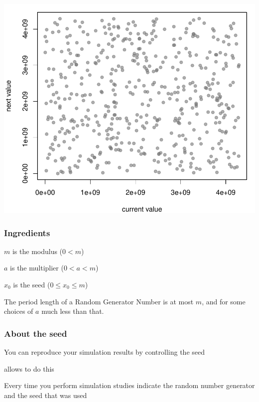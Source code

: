 \documentclass[12pt]{beamer}\usepackage[]{graphicx}\usepackage[]{color}
\newenvironment{knitrout}{}{} %
\begin{document}
\begin{frame}[fragile]

\begin{knitrout}\footnotesize
{}\color{fgcolor}

{\centering \includegraphics[width=.8\linewidth,height=.65\linewidth]{figure/unnamed-chunk-4-1} 

}



\end{knitrout}

\end{frame}


\begin{frame}
\frametitle{Ingredients}

\bi
  \item $m$ is the modulus ($0 < m$)
  \item $a$ is the multiplier ($0 < a < m$)
  \item $x_0$ is the seed ($0 \leq x_0 \leq m$)
\ei

\bigskip
The period length of a Random Generator Number is at most $m$, and for some choices of $a$ much less than that.

\end{frame}


\begin{frame}
\frametitle{About the seed}

\bi
  \item You can reproduce your simulation results by controlling the seed
  \item {\hilit {}} allows to do this
  \item Every time you perform simulation studies indicate the random number generator and the seed that was used
\ei

\end{frame}
\end{document}
